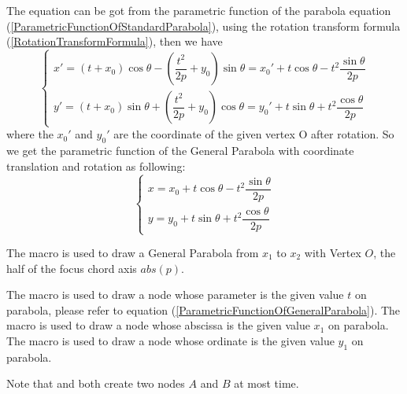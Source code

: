 \documentclass[11pt,english,BCOR=10mm,DIV=12,bibliography=totoc,parskip=false,headings=small,
    headinclude=false,footinclude=false,twoside,english]{pst-doc}
\begin{document}
The equation can be got from the parametric function of the parabola equation (\ref{ParametricFunctionOfStandardParabola}),
using the rotation transform formula (\ref{RotationTransformFormula}), then we have
\begin{equation}
\left\{\begin{array}{l}
x'=(t+x_0)\cos\theta-(\dfrac{t^2}{2p}+y_0)\sin\theta=x_0'+t\cos\theta-t^2\dfrac{\sin\theta}{2p}\\
y'=(t+x_0)\sin\theta+(\dfrac{t^2}{2p}+y_0)\cos\theta=y_0'+t\sin\theta+t^2\dfrac{\cos\theta}{2p}
\end{array}\right.
\end{equation}
where the $x_0'$ and $y_0'$ are the coordinate of the given vertex O after rotation.
So we get the parametric function of the General Parabola with coordinate translation and rotation as following:
\begin{equation}\label{ParametricFunctionOfGeneralParabola}
\left\{\begin{array}{l}
x=x_0+t\cos\theta-t^2\dfrac{\sin\theta}{2p}\\
y=y_0+t\sin\theta+t^2\dfrac{\cos\theta}{2p}
\end{array}\right.
\end{equation}

The macro  is used to draw a General Parabola from $x_1$ to $x_2$ with Vertex $O$,
the half of the focus chord axis $abs(p)$.

\begin{BDef}
\OptArgs{}\OptArg{$\theta$}
\end{BDef}

The macro  is used to draw a node whose parameter is the given value $t$ on parabola,
please refer to equation (\ref{ParametricFunctionOfGeneralParabola}).
The macro  is used to draw a node whose abscissa is the given value $x_1$ on parabola.
The macro  is used to draw a node whose ordinate is the given value $y_1$ on parabola.

Note that  and  both create two nodes $A$ and $B$
at most time.

\begin{BDef}
\OptArgs{}\OptArg{$\theta$}\\
\OptArgs{}\OptArg{$\theta$}\\
\OptArgs{}\OptArg{$\theta$}
\end{BDef}
\end{document}
